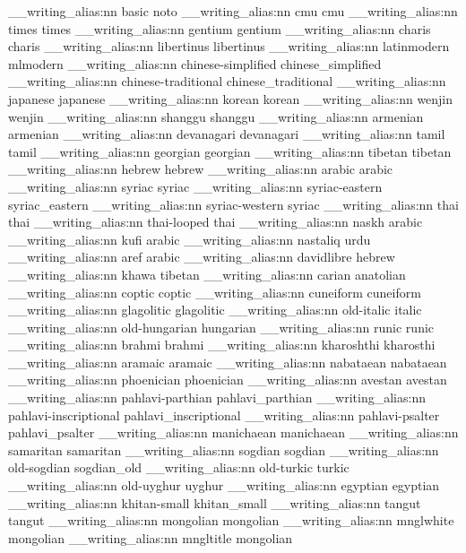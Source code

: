 \__writing_alias:nn {basic} {noto}
\__writing_alias:nn {cmu} {cmu}
\__writing_alias:nn {times} {times}
\__writing_alias:nn {gentium} {gentium}
\__writing_alias:nn {charis} {charis}
\__writing_alias:nn {libertinus} {libertinus}
\__writing_alias:nn {latinmodern} {mlmodern}
\__writing_alias:nn {chinese-simplified} {chinese_simplified}
\__writing_alias:nn {chinese-traditional} {chinese_traditional}
\__writing_alias:nn {japanese} {japanese}
\__writing_alias:nn {korean} {korean}
\__writing_alias:nn {wenjin} {wenjin}
\__writing_alias:nn {shanggu} {shanggu}
\__writing_alias:nn {armenian} {armenian}
\__writing_alias:nn {devanagari} {devanagari}
\__writing_alias:nn {tamil} {tamil}
\__writing_alias:nn {georgian} {georgian}
\__writing_alias:nn {tibetan} {tibetan}
\__writing_alias:nn {hebrew} {hebrew}
\__writing_alias:nn {arabic} {arabic}
\__writing_alias:nn {syriac} {syriac}
\__writing_alias:nn {syriac-eastern} {syriac_eastern}
\__writing_alias:nn {syriac-western} {syriac}
\__writing_alias:nn {thai} {thai}
\__writing_alias:nn {thai-looped} {thai}
\__writing_alias:nn {naskh} {arabic}
\__writing_alias:nn {kufi} {arabic}
\__writing_alias:nn {nastaliq} {urdu}
\__writing_alias:nn {aref} {arabic}
\__writing_alias:nn {davidlibre} {hebrew}
\__writing_alias:nn {khawa} {tibetan}
\__writing_alias:nn {carian} {anatolian}
\__writing_alias:nn {coptic} {coptic}
\__writing_alias:nn {cuneiform} {cuneiform}
\__writing_alias:nn {glagolitic} {glagolitic}
\__writing_alias:nn {old-italic} {italic}
\__writing_alias:nn {old-hungarian} {hungarian}
\__writing_alias:nn {runic} {runic}
\__writing_alias:nn {brahmi} {brahmi}
\__writing_alias:nn {kharoshthi} {kharosthi}
\__writing_alias:nn {aramaic} {aramaic}
\__writing_alias:nn {nabataean} {nabataean}
\__writing_alias:nn {phoenician} {phoenician}
\__writing_alias:nn {avestan} {avestan}
\__writing_alias:nn {pahlavi-parthian} {pahlavi_parthian}
\__writing_alias:nn {pahlavi-inscriptional} {pahlavi_inscriptional}
\__writing_alias:nn {pahlavi-psalter} {pahlavi_psalter}
\__writing_alias:nn {manichaean} {manichaean}
\__writing_alias:nn {samaritan} {samaritan}
\__writing_alias:nn {sogdian} {sogdian}
\__writing_alias:nn {old-sogdian} {sogdian_old}
\__writing_alias:nn {old-turkic} {turkic}
\__writing_alias:nn {old-uyghur} {uyghur}
\__writing_alias:nn {egyptian} {egyptian}
\__writing_alias:nn {khitan-small} {khitan_small}
\__writing_alias:nn {tangut} {tangut}
\__writing_alias:nn {mongolian} {mongolian}
\__writing_alias:nn {mnglwhite} {mongolian}
\__writing_alias:nn {mngltitle} {mongolian}
